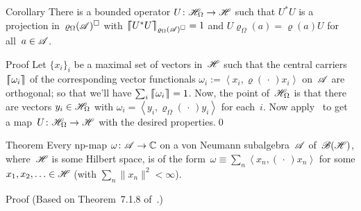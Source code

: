 \documentclass[a]{subfiles}
\begin{document}
\begin{parsec}
\begin{point}{Corollary}
There is a bounded operator $U\colon \mathscr{H}_\Omega\to\mathscr{H}$
such that $U^*U$ is a projection
in~$\varrho_\Omega(\mathscr{A})^\square$
with 
$\left\lceil\!\!\left\lceil U^*U\right\rceil\!\!\right\rceil_{\varrho_\Omega(\mathscr{A})^\square}=1$
and
$U\varrho_\Omega(a)= \varrho(a) U$
for all~$a\in\mathscr{A}$.
\begin{point}{Proof}%
Let $\{x_i\}_i$ be a maximal set of vectors
in~$\mathscr{H}$ 
such that the 
central carriers~$\left\lceil\!\!\left\lceil\omega_i\right\rceil\!\!\right\rceil$
of the corresponding vector functionals
$\omega_i :=\left<x_i,\varrho(\,\cdot\,)x_i\right>$
on~$\mathscr{A}$
are orthogonal;
so that we'll 
have $\sum_i \left\lceil\!\!\left\lceil\omega_i\right\rceil\!\!\right\rceil=1$.
Now, the point of~$\mathscr{H}_\Omega$ 
is that there are vectors $y_i\in\mathscr{H}_\Omega$
with $\omega_i=\left<y_i,\varrho_\Omega(\,\cdot\,)y_i\right>$
for each~$i$.
Now apply~
to get a map~$U\colon \mathscr{H}_\Omega\to \mathscr{H}$
with the desired properties.\qed
\end{point}
\end{point}
\begin{point}{Theorem}%
Every np-map $\omega\colon \mathscr{A}\to\mathbb{C}$
on a von Neumann subalgebra~$\mathscr{A}$
of~$\mathscr{B}(\mathscr{H})$,
where~$\mathscr{H}$ is some Hilbert space,
is of the 
form~$\omega \equiv \sum_n \left<x_n,(\,\cdot\,)x_n\right>$
for some $x_1,x_2,\dotsc \in\mathscr{H}$
(with $\sum_n\|x_n\|^2<\infty$).
\begin{point}{Proof}%
(Based on Theorem~7.1.8 of~\cite{kr}.)


\end{point}
\end{point}
\end{parsec}
\end{document}
